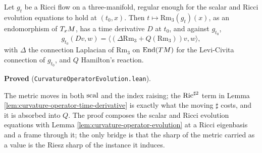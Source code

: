\begin{theorem}
  \label{thm:curvature-operator-evolution-flow}
  \leanok
  Let $g_t$ be a Ricci flow on a three-manifold, regular enough for the scalar and Ricci
  evolution equations to hold at $(t_0,x)$. Then $t \mapsto \mathrm{Rm}_3(g_t)(x)$, as an
  endomorphism of $T_xM$, has a time derivative $D$ at $t_0$, and against $g_{t_0}$,
  \[ g_{t_0}(Dv, w) = \langle (\Delta \mathrm{Rm}_3 + Q(\mathrm{Rm}_3))v, w\rangle, \]
  with $\Delta$ the connection Laplacian of $\mathrm{Rm}_3$ on $\operatorname{End}(TM)$ for the
  Levi-Civita connection of $g_{t_0}$, and $Q$ Hamilton's reaction.

  \textbf{Proved} (\texttt{CurvatureOperatorEvolution.lean}).

  The metric moves in both $\operatorname{scal}$ and the index raising; the $\operatorname{Ric}^{\sharp 2}$ term in
  Lemma \ref{lem:curvature-operator-time-derivative} is exactly what the moving $\sharp$ costs,
  and it is absorbed into $Q$. The proof composes the scalar and Ricci evolution equations with
  Lemma \ref{lem:curvature-operator-evolution} at a Ricci eigenbasis and a frame through it;
  the only bridge is that the sharp of the metric carried as a value is the Riesz sharp of the
  instance it induces.
\end{theorem}



